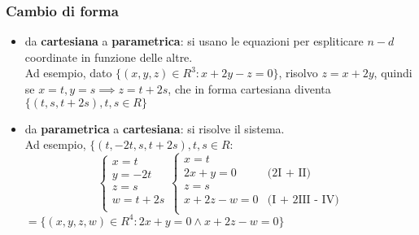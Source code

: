\documentclass{article}
\begin{document}
\subsubsection{Cambio di forma}
\begin{itemize}
	\item da \textbf{cartesiana} a \textbf{parametrica}: si usano le equazioni per espliticare $n - d$ coordinate in funzione delle altre.\\
	Ad esempio, dato $\{(x,y,z) \in R^3 : x + 2y - z = 0\}$, risolvo $z = x+2y$, quindi se $x=t,y=s \implies z=t+2s$, che in forma cartesiana diventa $\{(t,s,t+2s), t,s \in R\}$
	\item da \textbf{parametrica} a \textbf{cartesiana}: si risolve il sistema.\\
	Ad esempio, $\{(t,-2t,s,t+2s),t,s \in R$:
	\begin{equation}
		\begin{cases}
			x = t \\
			y = -2t \\
			z = s \\
			w = t+2s \\
		\end{cases}
		\begin{cases}
			x = t \\
			2x + y = 0 & \mbox{(2I + II)} \\
			z = s \\
			x + 2z - w = 0 & \mbox{(I + 2III - IV)} \\	
		\end{cases}
	\end{equation}
	$ = \{(x,y,z,w) \in R^4 : 2x + y = 0 \wedge x + 2z - w = 0\}$
\end{itemize}
\end{document}
